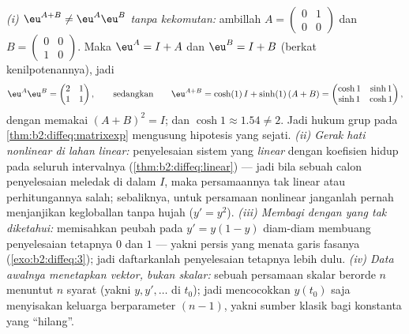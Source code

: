 \begin{remark}
\emph{(i) $\eu^{A+B} \neq \eu^A\eu^B$ tanpa kekomutan:}
ambillah $A = \begin{pmatrix} 0 & 1\\ 0 & 0\end{pmatrix}$ dan $B =
\begin{pmatrix} 0 & 0\\ 1 & 0\end{pmatrix}$. Maka $\eu^A = I +
A$ dan $\eu^B = I + B$ (berkat kenilpotenannya), jadi
\[
\eu^A\eu^B = \begin{pmatrix} 2 & 1\\ 1 & 1\end{pmatrix},
\qquad\text{sedangkan}\qquad
\eu^{A+B} = \cosh(1)\,I + \sinh(1)\,(A + B)
= \begin{pmatrix} \cosh 1 & \sinh 1\\ \sinh 1 & \cosh 1
\end{pmatrix},
\]
dengan memakai $(A+B)^2 = I$; dan $\cosh 1 \approx 1.54 \neq 2$. Jadi
hukum grup pada \cref{thm:b2:diffeq:matrixexp} mengusung hipotesis
yang sejati. \emph{(ii) Gerak hati nonlinear di lahan linear:}
penyelesaian sistem yang \emph{linear} dengan koefisien
 hidup pada seluruh intervalnya
(\cref{thm:b2:diffeq:linear}) --- jadi bila sebuah calon penyelesaian
meledak di dalam $I$, maka persamaannya tak linear atau
perhitungannya salah; sebaliknya, untuk persamaan nonlinear
janganlah pernah menjanjikan kegloballan tanpa hujah ($y' = y^2$).
\emph{(iii) Membagi dengan yang tak diketahui:} memisahkan peubah pada
$y' = y(1-y)$ diam-diam membuang penyelesaian tetapnya $0$ dan
$1$ --- yakni persis yang menata garis fasanya
(\cref{exo:b2:diffeq:3}); jadi daftarkanlah penyelesaian tetapnya lebih dulu.
\emph{(iv) Data awalnya menetapkan vektor, bukan skalar:} sebuah persamaan
skalar berorde $n$ menuntut $n$ syarat (yakni $y, y', \dots$ di
$t_0$); jadi mencocokkan $y(t_0)$ saja menyisakan keluarga
berparameter $(n-1)$, yakni sumber klasik bagi konstanta yang ``hilang''.
\end{remark}

